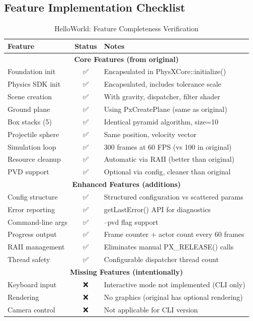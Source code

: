 \subsection{Feature Implementation Checklist}

\begin{table}[h]
\centering
\caption{HelloWorld: Feature Completeness Verification}
\begin{tabularx}{\textwidth}{|l|c|X|}
\hline
\textbf{Feature} & \textbf{Status} & \textbf{Notes} \\ \hline
\multicolumn{3}{|c|}{\textbf{Core Features (from original)}} \\ \hline
Foundation init & ✅ & Encapsulated in PhysXCore::initialize() \\ \hline
Physics SDK init & ✅ & Encapsulated, includes tolerance scale \\ \hline
Scene creation & ✅ & With gravity, dispatcher, filter shader \\ \hline
Ground plane & ✅ & Using PxCreatePlane (same as original) \\ \hline
Box stacks (5) & ✅ & Identical pyramid algorithm, size=10 \\ \hline
Projectile sphere & ✅ & Same position, velocity vector \\ \hline
Simulation loop & ✅ & 300 frames at 60 FPS (vs 100 in original) \\ \hline
Resource cleanup & ✅ & Automatic via RAII (better than original) \\ \hline
PVD support & ✅ & Optional via config, cleaner than original \\ \hline
\multicolumn{3}{|c|}{\textbf{Enhanced Features (additions)}} \\ \hline
Config structure & ✅ & Structured configuration vs scattered params \\ \hline
Error reporting & ✅ & getLastError() API for diagnostics \\ \hline
Command-line args & ✅ & --pvd flag support \\ \hline
Progress output & ✅ & Frame counter + actor count every 60 frames \\ \hline
RAII management & ✅ & Eliminates manual PX\_RELEASE() calls \\ \hline
Thread safety & ✅ & Configurable dispatcher thread count \\ \hline
\multicolumn{3}{|c|}{\textbf{Missing Features (intentionally)}} \\ \hline
Keyboard input & ❌ & Interactive mode not implemented (CLI only) \\ \hline
Rendering & ❌ & No graphics (original has optional rendering) \\ \hline
Camera control & ❌ & Not applicable for CLI version \\ \hline
\end{tabularx}
\end{table}

